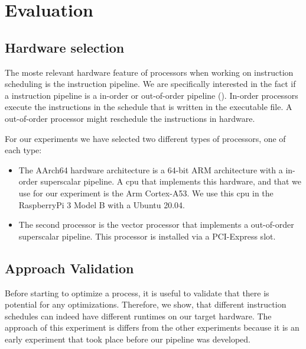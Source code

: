 \chapter{Evaluation}
\label{eval:svm}
\section{Hardware selection}
\label{sec:eval:hw}
The moste relevant hardware feature of processors when working on instruction scheduling is the instruction pipeline.
We are specifically interested in the fact if a instruction pipeline is a in-order or out-of-order pipeline ().
In-order processors execute the instructions in the schedule that is written in the executable file.
A out-of-order processor might reschedule the instructions in hardware.

For our experiments we have selected two different types of processors, one of each type:
\begin{itemize}
    \item 
    The AArch64 hardware architecture is a 64-bit ARM architecture with a in-order superscalar pipeline.
    A \ac{cpu} that implements this hardware, and that we use for our experiment is the Arm Cortex-A53.
    We use this \ac{cpu} in the RaspberryPi 3 Model B with a Ubuntu 20.04.
    
    \item
    The second processor is the \aurora vector processor that implements a out-of-order superscalar pipeline.
    This processor is installed via a PCI-Express slot.
\end{itemize}
    
\section{Approach Validation}
Before starting to optimize a process, it is useful to validate that there is potential for any optimizations.
Therefore, we show, that different instruction schedules can indeed have different runtimes on our target hardware.
The approach of this experiment is differs from the other experiments because it is an early experiment that took place before our pipeline was developed.

